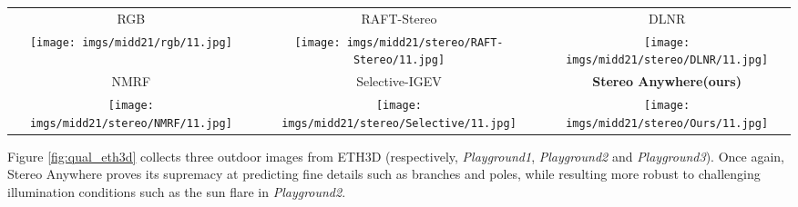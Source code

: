 \documentclass[10pt,twocolumn,letterpaper]{article}
\newcommand{\method}[0]{Stereo Anywhere\xspace}
\begin{document}
\begin{figure*}[h]
    \centering
    \renewcommand{\tabcolsep}{1pt}
    \begin{tabular}{ccc}
        \small RGB &
        \small RAFT-Stereo \cite{lipson2021raft} &
        \small DLNR \cite{zhao2023high} \\
        \texttt{[image: imgs/midd21/rgb/11.jpg]} &
        \texttt{[image: imgs/midd21/stereo/RAFT-Stereo/11.jpg]} &
        \texttt{[image: imgs/midd21/stereo/DLNR/11.jpg]} \\
        \small NMRF \cite{guan2024neural} &
        \small Selective-IGEV \cite{wang2024selective} &
        \textbf{\method (ours)} \\
        \texttt{[image: imgs/midd21/stereo/NMRF/11.jpg]} &
        \texttt{[image: imgs/midd21/stereo/Selective/11.jpg]} &
        \texttt{[image: imgs/midd21/stereo/Ours/11.jpg]} \\
    \end{tabular}

    \caption{\textbf{Qualitative Results -- Middlebury 2021 (part 2).} Predictions by state-of-the-art models and \method.}
    \label{fig:qual_midd21_2}\vspace{-0.3cm}

\end{figure*}

\clearpage

Figure \ref{fig:qual_eth3d} collects three outdoor images from ETH3D (respectively, \textit{Playground1}, \textit{Playground2} and \textit{Playground3}). Once again, \method proves its supremacy at predicting fine details such as branches and poles, while resulting more robust to challenging illumination conditions such as the sun flare in \textit{Playground2}.
\end{document}
